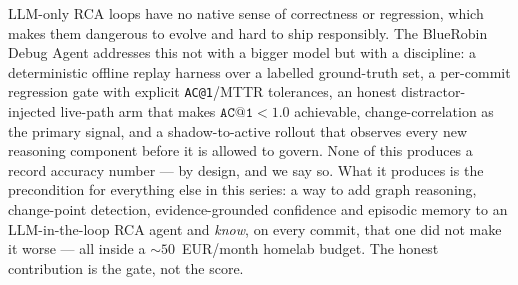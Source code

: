 \documentclass[11pt]{article}
\makeatletter
\newcommand{\acone}{\texttt{AC@1}}
\makeatother
\begin{document}
LLM-only RCA loops have no native sense of correctness or regression, which makes them
dangerous to evolve and hard to ship responsibly. The BlueRobin Debug Agent addresses this
not with a bigger model but with a discipline: a deterministic offline replay harness over a
labelled ground-truth set, a per-commit regression gate with explicit \acone{}/MTTR
tolerances, an honest distractor-injected live-path arm that makes $\acone{} < 1.0$
achievable, change-correlation as the primary signal, and a shadow-to-active rollout that
observes every new reasoning component before it is allowed to govern. None of this produces
a record accuracy number --- by design, and we say so. What it produces is the precondition
for everything else in this series: a way to add graph reasoning, change-point detection,
evidence-grounded confidence and episodic memory to an LLM-in-the-loop RCA agent and
\emph{know}, on every commit, that one did not make it worse --- all inside a
${\sim}50$~EUR/month homelab budget. The honest contribution is the gate, not the score.



\end{document}

